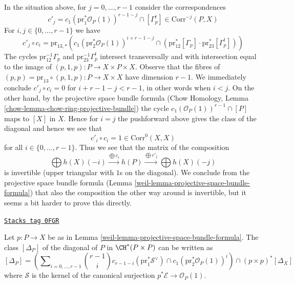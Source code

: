 In the situation above, for $j = 0, \ldots, r - 1$ consider
the correspondences
$$
c'_j = c_1(\text{pr}_1^*\mathcal{O}_P(1))^{r - 1 - j} \cap [\Gamma_p^t] \in
\text{Corr}^{-j}(P, X)
$$
For $i, j \in \{0, \ldots, r - 1\}$ we have
$$
c'_j \circ c_i =
\text{pr}_{13, *}\left(
c_1(\text{pr}_2^*\mathcal{O}_P(1))^{i + r - 1 - j} \cap
(\text{pr}_{12}^*[\Gamma_p] \cdot \text{pr}_{23}^*[\Gamma_p^t])
\right)
$$
The cycles $\text{pr}_{12}^{-1}\Gamma_p$ and
$\text{pr}_{23}^{-1}\Gamma_p^t$ intersect transversally and
with intersection equal to the image of
$(p, 1, p) : P \to X \times P \times X$.
Observe that the fibres of
$(p, p) = \text{pr}_{13} \circ (p, 1, p) : P \to X \times X$
have dimension $r - 1$. We immediately conclude
$c'_j \circ c_i = 0$ for $i + r - 1 - j < r - 1$, in other words when $i < j$.
On the other hand, by the projective space bundle formula
(Chow Homology, Lemma \ref{chow-lemma-chow-ring-projective-bundle})
the cycle $c_1(\mathcal{O}_P(1))^{r - 1} \cap [P]$ maps
to $[X]$ in $X$. Hence for $i = j$ the pushforward above
gives the class of the diagonal and hence
we see that
$$
c'_i \circ c_i = 1 \in \text{Corr}^0(X, X)
$$
for all $i \in \{0, \ldots, r - 1\}$. Thus we see that the matrix
of the composition
$$
\bigoplus h(X)(-i)
\xrightarrow{\bigoplus c_i}
h(P)
\xrightarrow{\bigoplus c'_j}
\bigoplus h(X)(-j)
$$
is invertible (upper triangular with $1$s on the diagonal).
We conclude from the projective space bundle formula
(Lemma \ref{weil-lemma-projective-space-bundle-formula})
that also the composition the other way around is
invertible, but it seems a bit harder to prove this directly.

\begin{lemma}
\label{weil-lemma-diagonal-projective-bundle}
\href{https://stacks.math.columbia.edu/tag/0FGR}{\texttt{Stacks tag 0FGR}}

Let $p : P \to X$ be as in Lemma \ref{weil-lemma-projective-space-bundle-formula}.
The class $[\Delta_P]$ of the diagonal of $P$ in $\CH^*(P \times P)$
can be written
as
$$
[\Delta_P] =
\left(\sum\nolimits_{i = 0, \ldots, r - 1}
{r - 1 \choose i} c_{r - 1 - i}(\text{pr}_1^*\mathcal{S}^\vee) \cap
c_1(\text{pr}_2^*\mathcal{O}_P(1))^i\right)
\cap
(p \times p)^*[\Delta_X]
$$
where $\mathcal{S}$ is the kernel of the canonical surjection
$p^*\mathcal{E} \to \mathcal{O}_P(1)$.
\end{lemma}

